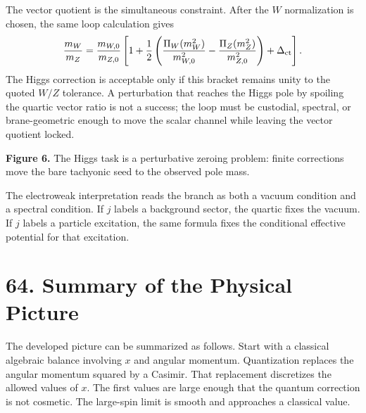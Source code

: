 \documentclass[11pt]{article}
\begin{document}
The vector quotient is the simultaneous constraint. After the \(W\) normalization is chosen, the same loop calculation gives
\[
        \frac{m_W}{m_Z}
        =
        \frac{m_{W,0}}{m_{Z,0}}
        \left[
        1+\frac12
        \left(
        \frac{\Pi_W(m_W^2)}{m_{W,0}^2}
        -
        \frac{\Pi_Z(m_Z^2)}{m_{Z,0}^2}
        \right)
        +\Delta_{\rm ct}
        \right].
\]
The Higgs correction is acceptable only if this bracket remains unity to the quoted \(W/Z\) tolerance. A perturbation that reaches the Higgs pole by spoiling the quartic vector ratio is not a success; the loop must be custodial, spectral, or brane-geometric enough to move the scalar channel while leaving the vector quotient locked.

\begin{center}

\textbf{Figure 6.} The Higgs task is a perturbative zeroing problem: finite corrections move the bare tachyonic seed to the observed pole mass.
\end{center}

The electroweak interpretation reads the branch as both a vacuum condition and a spectral condition. If \(j\) labels a background sector, the quartic fixes the vacuum. If \(j\) labels a particle excitation, the same formula fixes the conditional effective potential for that excitation.

\section*{64. Summary of the Physical Picture}

The developed picture can be summarized as follows. Start with a classical algebraic balance involving \(x\) and angular momentum. Quantization replaces the angular momentum squared by a Casimir. That replacement discretizes the allowed values of \(x\). The first values are large enough that the quantum correction is not cosmetic. The large-spin limit is smooth and approaches a classical value.
\end{document}
